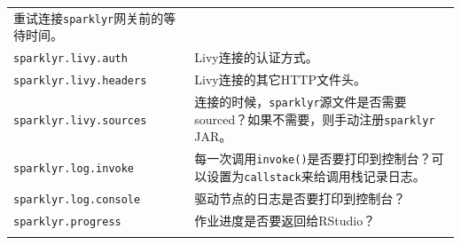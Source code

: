 \documentclass[
]{article}
\begin{document}
\begin{longtable}[]{@{}ll@{}}
\begin{minipage}[t]{0.47\columnwidth}
重试连接\texttt{sparklyr}网关前的等待时间。\strut
\end{minipage}\tabularnewline
\begin{minipage}[t]{0.47\columnwidth}\raggedright
\texttt{sparklyr.livy.auth}\strut
\end{minipage} & \begin{minipage}[t]{0.47\columnwidth}\raggedright
Livy连接的认证方式。\strut
\end{minipage}\tabularnewline
\begin{minipage}[t]{0.47\columnwidth}\raggedright
\texttt{sparklyr.livy.headers}\strut
\end{minipage} & \begin{minipage}[t]{0.47\columnwidth}\raggedright
Livy连接的其它HTTP文件头。\strut
\end{minipage}\tabularnewline
\begin{minipage}[t]{0.47\columnwidth}\raggedright
\texttt{sparklyr.livy.sources}\strut
\end{minipage} & \begin{minipage}[t]{0.47\columnwidth}\raggedright
连接的时候，\texttt{sparklyr}源文件是否需要sourced？如果不需要，则手动注册\texttt{sparklyr}
JAR。\strut
\end{minipage}\tabularnewline
\begin{minipage}[t]{0.47\columnwidth}\raggedright
\texttt{sparklyr.log.invoke}\strut
\end{minipage} & \begin{minipage}[t]{0.47\columnwidth}\raggedright
每一次调用\texttt{invoke()}是否要打印到控制台？可以设置为\texttt{callstack}来给调用栈记录日志。\strut
\end{minipage}\tabularnewline
\begin{minipage}[t]{0.47\columnwidth}\raggedright
\texttt{sparklyr.log.console}\strut
\end{minipage} & \begin{minipage}[t]{0.47\columnwidth}\raggedright
驱动节点的日志是否要打印到控制台？\strut
\end{minipage}\tabularnewline
\begin{minipage}[t]{0.47\columnwidth}\raggedright
\texttt{sparklyr.progress}\strut
\end{minipage} & \begin{minipage}[t]{0.47\columnwidth}\raggedright
作业进度是否要返回给RStudio？\strut
\end{minipage}\tabularnewline
\begin{minipage}[t]{0.47\columnwidth}\raggedright

\end{minipage}
\end{longtable}
\end{document}
